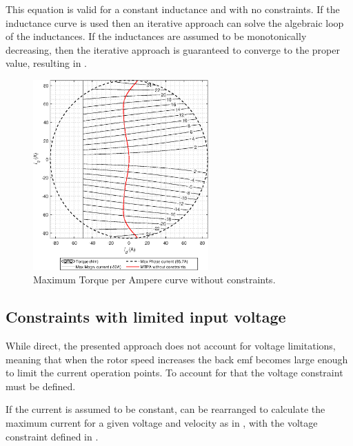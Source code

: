 This equation is valid for a constant inductance and with no constraints. If the inductance curve is used then an iterative approach can solve the algebraic loop of the inductances. If the inductances are assumed to be monotonically decreasing, then the iterative approach is guaranteed to converge to the proper value, resulting in .

\begin{figure}[!htb]
	\centering
	\includegraphics[width=0.6\textwidth]{Figures/Torque_MTPA_simple.eps}
	\caption[Maximum Torque per Ampere curve without constraints.]{Maximum Torque per Ampere curve without constraints.}
	\label{fig:mtpa_simple} %
\end{figure}

\subsection{Constraints with limited input voltage}

While direct, the presented approach does not account for voltage limitations, meaning that when the rotor speed increases the back emf becomes large enough to limit the current operation points. To account for that the voltage constraint must be defined.

If the current is assumed to be constant,  can be rearranged to calculate the maximum current for a given voltage and velocity as in , with the voltage constraint defined in .

